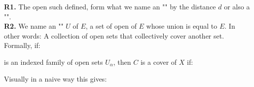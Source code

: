 	\begin{tcolorbox}[title=Remarks,arc=10pt,breakable,drop lifted shadow,
  skin=enhanced,
  skin first is subskin of={enhancedfirst}{arc=10pt,no shadow},
  skin middle is subskin of={enhancedmiddle}{arc=10pt,no shadow},
  skin last is subskin of={enhancedlast}{drop lifted shadow}]
	\textbf{R1.} The open such defined, form what we name an "" by the distance $d$ or also a "".\\
	
	\textbf{R2.} We name an "" $U$ of $E$, a set of open of $E$ whose union is equal to $E$. In other words: A collection of open sets that collectively cover another set.\\
	
	Formally, if:
	
	is an indexed family of open sets $U_\alpha$, then $C$ is a cover of $X$ if:
	
	Visually in a naive way this gives:
	\begin{figure}[H]
		\centering
		\begin{tikzpicture}[x=0.75pt,y=0.75pt,yscale=-1,xscale=1]
		

\end{tikzpicture}
\end{figure}
\end{tcolorbox}
